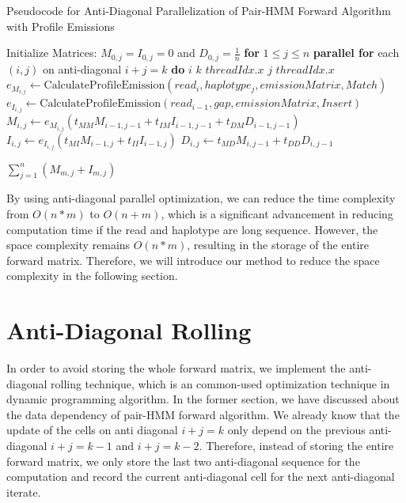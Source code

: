 \documentclass[PhD]{PHlab-thesis}
\begin{document}
\begin{algorithm}[h]
\caption{Pseudocode for Anti-Diagonal Parallelization of Pair-HMM Forward Algorithm with Profile Emissions}
\begin{algorithmic}[1]
\State Initialize Matrices: $M_{0,j} = I_{0,j} = 0$ and $D_{0,j} = \frac{1}{n}$ \textbf{for} $1 \leq j \leq n$
    \State \textbf{parallel for} each $(i, j)$ on anti-diagonal $i+j=k$ \textbf{do}
    \State $i$ \gets $k$ \minus $threadIdx.x$
    \State $j$ \gets $threadIdx.x$
        \State $e_{M_{i,j}} \gets \text{CalculateProfileEmission}(read_i, haplotype_j, emissionMatrix, Match)$
        \State $e_{I_{i,j}} \gets \text{CalculateProfileEmission}(read_{i-1}, gap, emissionMatrix, Insert)$
        \State $M_{i,j} \gets e_{M_{i,j}} (t_{MM} M_{i-1,j-1} + t_{IM} I_{i-1,j-1} + t_{DM}  D_{i-1,j-1})$
        \State $I_{i,j} \gets e_{I_{i,j}}  (t_{MI}  M_{i-1,j} + t_{II}  I_{i-1,j})$
        \State $D_{i,j} \gets t_{MD}  M_{i,j-1} + t_{DD}  D_{i,j-1}$
    \EndIf
\EndFor

\State \Return $\sum_{j=1}^{n} (M_{m,j} + I_{m,j})$
\EndProcedure
\end{algorithmic}
\end{algorithm}

By using anti-diagonal parallel optimization, we can reduce the time complexity from $O(n*m)$ to $O(n+m)$, which is a significant advancement in reducing computation time if the read and haplotype are long sequence. However, the space complexity remains $O(n*m)$, resulting in the storage of the entire forward matrix. Therefore, we will introduce our method to reduce the space complexity in the following section.
\newpage
\section{Anti-Diagonal Rolling}
In order to avoid storing the whole forward matrix, we implement the anti-diagonal rolling technique, which is an common-used optimization technique in dynamic programming algorithm. In the former section, we have discussed about the data dependency of pair-HMM forward algorithm. We already know that the update of the cells on anti diagonal $i+j=k$ only depend on the previous anti-diagonal $i+j=k-1$ and $i+j=k-2$. Therefore, instead of storing the entire forward matrix, we only store the last two anti-diagonal sequence for the computation and record the current anti-diagonal cell for the next anti-diagonal iterate. 
\end{document}
